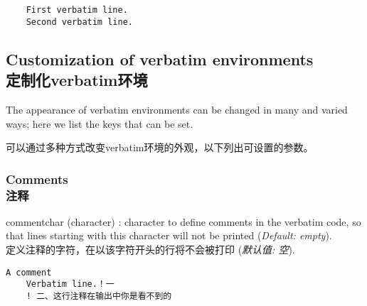 \documentclass[twoside]{article}
\providecommand\optname[1]{\textsf{#1}}
\newenvironment{optlist}{\begin{description}%
  \renewcommand\makelabel[1]{%
    \descriptionlabel{\mdseries\optname{##1}}}%
  \itemsep0.25\itemsep}%
 {\end{description}}
\begin{document}
\begin{SideBySideExample}
  \begin{Verbatim}
    First verbatim line.
    Second verbatim line.
  \end{Verbatim}
\end{SideBySideExample}

\subsection{Customization of verbatim environments\\定制化verbatim环境}

  The appearance of verbatim environments can be changed in many and
varied ways; here we list the keys that can be set. 

可以通过多种方式改变verbatim环境的外观，以下列出可设置的参数。


\subsubsection{Comments\\注释}

\begin{optlist}
  \item[commentchar (character)]: character to define comments in the
  verbatim code, so that lines starting with this character will not be
  printed (\emph{Default: empty}).
\\定义注释的字符，在以该字符开头的行将不会被打印 (\emph{默认值: 空}).
\end{optlist}


\begin{SideBySideExample}
  \begin{Verbatim}[commentchar=!]
    A comment
    Verbatim line.！一
    ! 二、这行注释在输出中你是看不到的
  \end{Verbatim}
\end{SideBySideExample}
\end{document}
